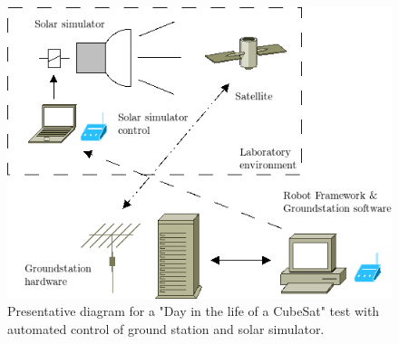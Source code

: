 \documentclass[english,12pt,a4paper,pdftex,elec,utf8]{aaltothesis}
\begin{document}
\begin{figure}[h!]
\centering
\includegraphics[scale=0.6]{dayinlifesetupdiagram}
\caption{Presentative diagram for a "Day in the life of a CubeSat" test with automated control of ground station and solar simulator.}
\label{dayinlifediagram}
\end{figure}   
  
\end{document}
